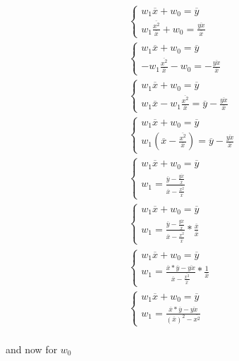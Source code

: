\documentclass[10pt,a4paper]{article}
\newcommand*\mean[1]{\overline{#1}}
\begin{document}
	\begin{align*}
		\begin{cases}
			w_1\mean{x}+w_0=\mean{y}\\
			w_1\frac{\mean{x^2}}{\mean{x}}+w_0=\frac{\mean{yx}}{\mean{x}}
		\end{cases}\\
		\begin{cases}
			w_1\mean{x}+w_0=\mean{y}\\
			-w_1\frac{\mean{x^2}}{\mean{x}}-w_0=-\frac{\mean{yx}}{\mean{x}}
		\end{cases}\\
		\begin{cases}
			w_1\mean{x}+w_0=\mean{y}\\
			w_1\mean{x}-w_1\frac{\mean{x^2}}{\mean{x}}=\mean{y}-\frac{\mean{yx}}{\mean{x}}
		\end{cases}\\
		\begin{cases}
			w_1\mean{x}+w_0=\mean{y}\\
			w_1(\mean{x}-\frac{\mean{x^2}}{\mean{x}})=\mean{y}-\frac{\mean{yx}}{\mean{x}}
		\end{cases}\\
		\begin{cases}
			w_1\mean{x}+w_0=\mean{y}\\
			w_1=\frac{\mean{y}-\frac{\mean{yx}}{\mean{x}}}{\mean{x}-\frac{\mean{x^2}}{\mean{x}}}
		\end{cases}\\
		\begin{cases}
			w_1\mean{x}+w_0=\mean{y}\\
			w_1=\frac{\mean{y}-\frac{\mean{yx}}{\mean{x}}}{\mean{x}-\frac{\mean{x^2}}{\mean{x}}}*\frac{\mean{x}}{\mean{x}}
		\end{cases}\\
		\begin{cases}
			w_1\mean{x}+w_0=\mean{y}\\
			w_1=\frac{\mean{x}*\mean{y}-\mean{yx}}{\mean{x}-\frac{\mean{x^2}}{\mean{x}}}*\frac{1}{\mean{x}}
		\end{cases}\\
		\begin{cases}
			w_1\mean{x}+w_0=\mean{y}\\
			w_1=\frac{\mean{x}*\mean{y}-\mean{yx}}{(\mean{x})^2-\mean{x^2}}
		\end{cases}\\
	\end{align*}
	
	and now for $w_0$
	
\end{document}
